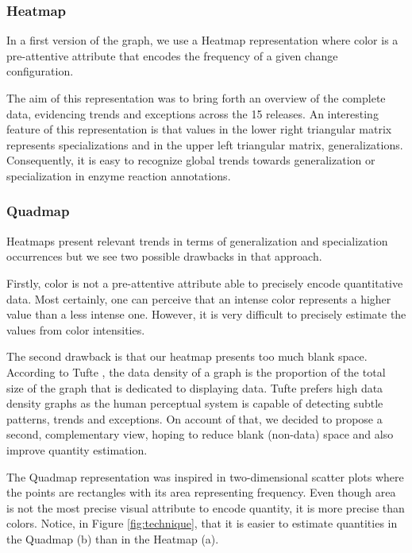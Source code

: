 \subsubsection{Heatmap}
\label{heatmap}

In a first version of the graph, we use a Heatmap representation where color is a pre-attentive attribute that encodes the frequency of a given change configuration. 

The aim of this representation was to bring forth an overview of the complete data, evidencing trends and exceptions across the 15 releases. An interesting feature of this representation is that values in the lower right triangular matrix represents specializations and in the upper left triangular matrix, generalizations. Consequently, it is easy to recognize global trends towards generalization or specialization in enzyme reaction annotations.

\subsubsection{Quadmap}
\label{quadmap}

Heatmaps present relevant trends in terms of generalization and specialization occurrences but we see two possible drawbacks in that approach. 

Firstly, color is not a pre-attentive attribute able to precisely encode quantitative data. Most certainly, one can perceive that an intense color represents a higher value than a less intense one. However, it is very difficult to precisely estimate the values from color intensities. 

The second drawback is that our heatmap presents too much blank space. According to Tufte \cite{tufte_envisioning}, the data density of a graph is the proportion of the total size of the graph that is dedicated to displaying data. Tufte prefers high data density graphs as the human perceptual system is capable of detecting subtle patterns, trends and exceptions. On account of that, we decided to propose a second, complementary view, hoping to reduce blank (non-data) space and also improve quantity estimation. 

The Quadmap representation was inspired in two-dimensional scatter plots where the points are rectangles with its area representing frequency. Even though area is not the most precise visual attribute to encode quantity, it is more precise than colors. Notice, in Figure \ref{fig:technique}, that it is easier to estimate quantities in the Quadmap (b) than in the Heatmap (a).

